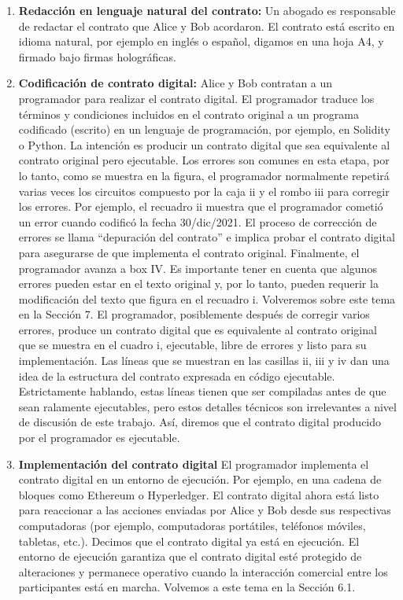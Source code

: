 \documentclass[12pt]{report} %
\begin{document}
\begin{enumerate}
    \item \textbf{ Redacción en lenguaje natural del contrato:} Un abogado es responsable de redactar el contrato que Alice y Bob acordaron. El contrato está escrito en idioma natural, por ejemplo en inglés o español, digamos en una hoja A4, y firmado bajo firmas holográficas.

    
    \item \textbf{ Codificación de contrato digital:} Alice y Bob contratan a un programador para realizar el contrato digital. El programador traduce los términos y condiciones incluidos en el contrato original a un programa codificado (escrito) en un lenguaje de programación, por ejemplo, en Solidity o Python. La intención es producir un contrato digital que sea equivalente al contrato original pero ejecutable. Los errores son comunes en esta etapa, por lo tanto, como se muestra en la figura, el programador normalmente repetirá varias veces los circuitos compuesto por la caja ii y el rombo iii para corregir los errores. Por ejemplo, el recuadro ii muestra que el programador cometió un error cuando codificó la fecha 30/dic/2021. El proceso de corrección de errores se llama “depuración del contrato” e implica probar el contrato digital para asegurarse de que implementa el contrato original. Finalmente, el programador avanza a box IV. Es importante tener en cuenta que algunos errores pueden estar en el texto original y, por lo tanto, pueden requerir la modificación del texto que figura en el recuadro i. Volveremos sobre este tema en la Sección 7. El programador, posiblemente después de corregir varios errores, produce un contrato digital que es equivalente al contrato original que se muestra en el cuadro i, ejecutable, libre de errores y listo para su implementación. Las líneas que se muestran en las casillas ii, iii y iv dan una idea de la estructura del contrato expresada en código ejecutable. Estrictamente hablando, estas líneas tienen que ser compiladas antes de que sean ralamente ejecutables, pero estos detalles técnicos son irrelevantes a nivel de discusión de este trabajo. Así, diremos que el contrato digital producido por el programador es ejecutable.


\item \textbf {Implementación del contrato digital} El programador implementa el contrato digital en un entorno de ejecución. Por ejemplo, en una cadena de bloques como Ethereum o Hyperledger. El contrato digital ahora está listo para reaccionar a las acciones enviadas por Alice y Bob desde sus respectivas computadoras (por ejemplo, computadoras portátiles, teléfonos móviles, tabletas, etc.). Decimos que el contrato digital ya está en ejecución. El entorno de ejecución garantiza que el contrato digital esté protegido de alteraciones y permanece operativo cuando la interacción comercial entre los participantes está en marcha. Volvemos a este tema en la Sección 6.1.



\end{enumerate}
\end{document}
